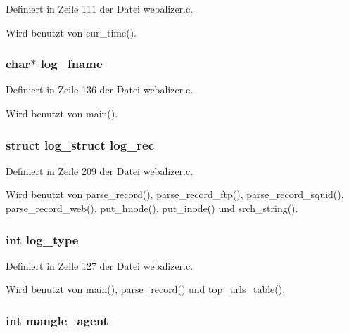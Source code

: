 Definiert in Zeile 111 der Datei webalizer.c.

Wird benutzt von cur\_\-time().
\subsubsection{\setlength{\rightskip}{0pt plus 5cm}char$\ast$ {\bf log\_\-fname}}\label{webalizer_8h_9db6dddd9890ca88ccca763b0533919b}




Definiert in Zeile 136 der Datei webalizer.c.

Wird benutzt von main().
\subsubsection{\setlength{\rightskip}{0pt plus 5cm}struct {\bf log\_\-struct} {\bf log\_\-rec}}\label{webalizer_8h_b78a7a0970e517ad18adea541d2b2b32}




Definiert in Zeile 209 der Datei webalizer.c.

Wird benutzt von parse\_\-record(), parse\_\-record\_\-ftp(), parse\_\-record\_\-squid(), parse\_\-record\_\-web(), put\_\-hnode(), put\_\-inode() und srch\_\-string().
\subsubsection{\setlength{\rightskip}{0pt plus 5cm}int {\bf log\_\-type}}\label{webalizer_8h_d1e2a6d9014a2af70dfa80ce7b69d4b0}




Definiert in Zeile 127 der Datei webalizer.c.

Wird benutzt von main(), parse\_\-record() und top\_\-urls\_\-table().
\subsubsection{\setlength{\rightskip}{0pt plus 5cm}int {\bf mangle\_\-agent}}\label{webalizer_8h_23d6ba920f8b5ddaea1f3e92958bdaba}




